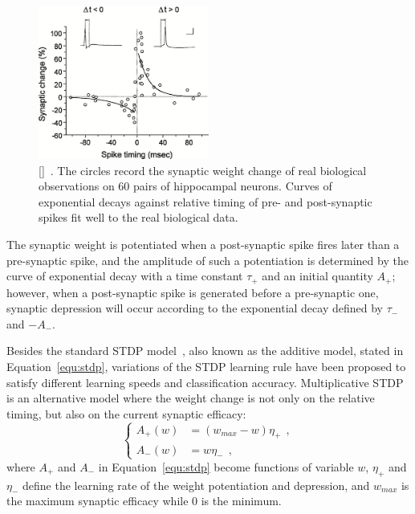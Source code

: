 \begin{figure}[bt!]
	\centering
	\includegraphics[width=0.5\textwidth]{pics_snn/stdp.jpeg}
	\caption{\DIFdelbeginFL {}\DIFdelendFL \DIFaddbeginFL {}[]\DIFaddendFL ~\citep{bi2001synaptic}.
	The circles record the synaptic weight change of real biological observations on 60 pairs of hippocampal neurons.
	Curves of exponential decays against relative timing of pre- and post-synaptic spikes fit well to the real biological data.
	}
	\label{Fig:STDP}
\end{figure}

The synaptic weight is potentiated when a post-synaptic spike fires later than a pre-synaptic spike, and the amplitude of such a potentiation is determined by the curve of exponential decay with a time constant $\tau_+$ and an initial quantity $A_+$;
however, when a post-synaptic spike is generated before a pre-synaptic one, synaptic depression will occur according to the exponential decay defined by $\tau_-$ and $-A_-$.

Besides the standard STDP model~\citep{song2000competitive}, also known as the additive model, stated in Equation~\ref{equ:stdp}, variations of the STDP learning rule have been proposed to satisfy different learning speeds and classification accuracy.
Multiplicative STDP~\citep{morrison2008phenomenological} is an alternative model where the weight change is not only \DIFdelbegin {}\DIFdelend \DIFaddbegin {}\DIFaddend on the relative timing, but also on the current synaptic efficacy:
\begin{equation}
\left\{
\begin{aligned}
A_+ (w) &=  (w_{max} - w)\eta_+~~, \\
A_- (w) &= w\eta_-~~,
\end{aligned}
\right.
\end{equation}
where $A_+$ and $A_-$ in Equation~\ref{equ:stdp} become functions of variable 
$w$, $\eta_+$ and $\eta_-$ define the learning rate of the weight potentiation and depression, and $w_{max}$ is the maximum synaptic efficacy while 0 is the minimum.

